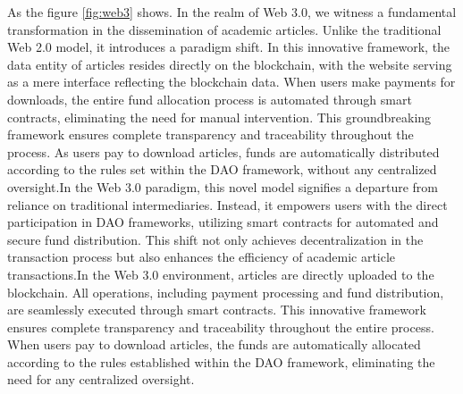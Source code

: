 \documentclass[lettersize,journal]{IEEEtran}
\begin{document}
As the figure \ref{fig:web3} shows. In the realm of Web 3.0, we witness a fundamental transformation in the dissemination of academic articles. Unlike the traditional Web 2.0 model, it introduces a paradigm shift. In this innovative framework, the data entity of articles resides directly on the blockchain, with the website serving as a mere interface reflecting the blockchain data. When users make payments for downloads, the entire fund allocation process is automated through smart contracts, eliminating the need for manual intervention. This groundbreaking framework ensures complete transparency and traceability throughout the process. As users pay to download articles, funds are automatically distributed according to the rules set within the DAO framework, without any centralized oversight.In the Web 3.0 paradigm, this novel model signifies a departure from reliance on traditional intermediaries. Instead, it empowers users with the direct participation in DAO frameworks, utilizing smart contracts for automated and secure fund distribution. This shift not only achieves decentralization in the transaction process but also enhances the efficiency of academic article transactions.In the Web 3.0 environment, articles are directly uploaded to the blockchain. All operations, including payment processing and fund distribution, are seamlessly executed through smart contracts. This innovative framework ensures complete transparency and traceability throughout the entire process. When users pay to download articles, the funds are automatically allocated according to the rules established within the DAO framework, eliminating the need for any centralized oversight.
\end{document}
